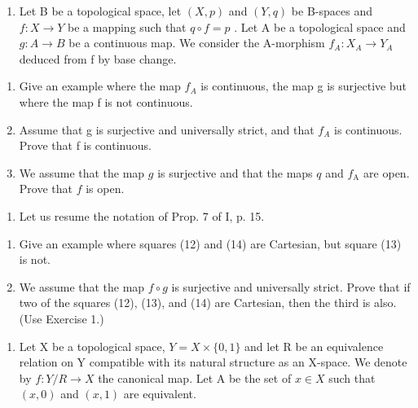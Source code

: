 
\exercisegroup

\begin{enumerate}
\def\labelenumi{\arabic{enumi})}
\tightlist
\item
  Let B be a topological space, let \((X,p)\) and \((Y,q)\) be B-spaces and \(f\colon X\to Y\) be a mapping such that \(q\circ f=p\) . Let A be a topological space and \(g\colon A\to B\) be a continuous map. We consider the A-morphism \(f_{A}\colon X_{A}\to Y_{A}\) deduced from f by base change.
\end{enumerate}

\begin{enumerate}
\def\labelenumi{\alph{enumi})}
\item
  Give an example where the map \(f_{A}\) is continuous, the map g is surjective but where the map f is not continuous.
\item
  Assume that g is surjective and universally strict, and that \(f_{A}\) is continuous. Prove that f is continuous.
\item
  We assume that the map \(g\) is surjective and that the maps \(q\) and \(f_{\mathrm{A}}\) are open. Prove that \(f\) is open.
\end{enumerate}

\begin{enumerate}
\def\labelenumi{\arabic{enumi})}
\setcounter{enumi}{1}
\tightlist
\item
  Let us resume the notation of Prop. 7 of I, p. 15.
\end{enumerate}

\begin{enumerate}
\def\labelenumi{\alph{enumi})}
\item
  Give an example where squares (12) and (14) are Cartesian, but square (13) is not.
\item
  We assume that the map \(f \circ g\) is surjective and universally strict. Prove that if two of the squares (12), (13), and (14) are Cartesian, then the third is also. (Use Exercise 1.)
\end{enumerate}

\exercisegroup

\begin{enumerate}
\def\labelenumi{\arabic{enumi})}
\tightlist
\item
  Let X be a topological space, \(Y = X \times \{0, 1\}\) and let R be an equivalence relation on Y compatible with its natural structure as an X-space. We denote by \(f: Y/R \to X\) the canonical map. Let A be the set of \(x \in X\) such that \((x, 0)\) and \((x, 1)\) are equivalent.
\end{enumerate}

